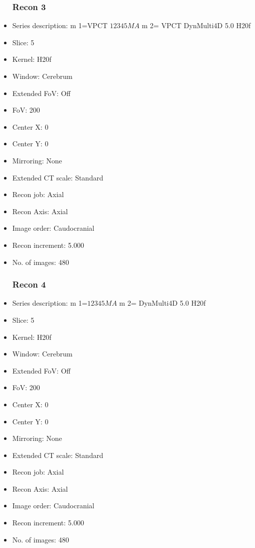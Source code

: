 \documentclass[12pt]{article}
\begin{document}
\begin{itemize}
\subsubsection{Recon 3}
\item Series description: m 1=VPCT $1$$2$$3$$4$$5$$M$$A$ m 2= VPCT DynMulti4D 5.0 H20f
\item Slice: 5
\item Kernel: H20f
\item Window: Cerebrum
\item Extended FoV: Off
\item FoV: 200
\item Center X: 0
\item Center Y: 0
\item Mirroring: None
\item Extended CT scale: Standard
\item Recon job: Axial
\item Recon Axis: Axial
\item Image order: Caudocranial
\item Recon increment: 5.000
\item No. of images: 480
\subsubsection{Recon 4}
\item Series description: m 1=$1$$2$$3$$4$$5$$M$$A$ m 2= DynMulti4D 5.0 H20f
\item Slice: 5
\item Kernel: H20f
\item Window: Cerebrum
\item Extended FoV: Off
\item FoV: 200
\item Center X: 0
\item Center Y: 0
\item Mirroring: None
\item Extended CT scale: Standard
\item Recon job: Axial
\item Recon Axis: Axial
\item Image order: Caudocranial
\item Recon increment: 5.000
\item No. of images: 480
\end{itemize}
\end{document}
